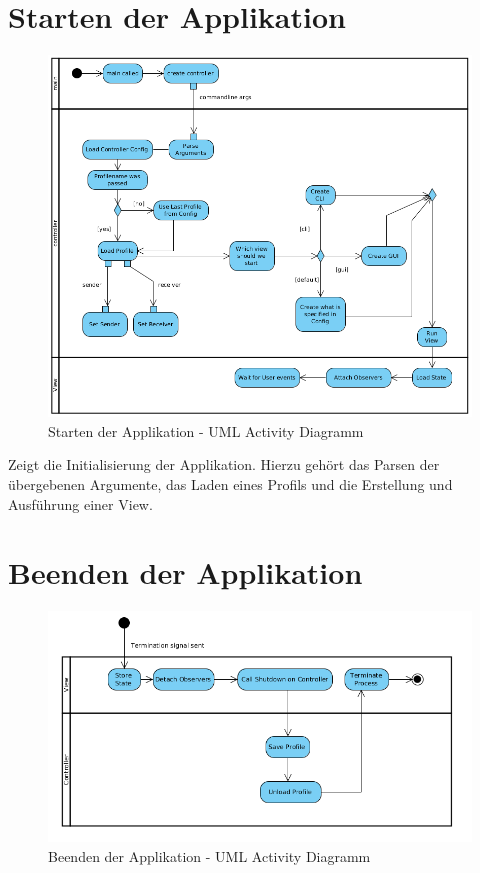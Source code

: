 
\section{Starten der Applikation}
\label{sec:5:startapp}
\begin{figure}[H]
\includegraphics[width=15cm]{images/Init.png}
\centering
\caption{Starten der Applikation - UML Activity Diagramm}
\label{fig_init}
\end{figure}

Zeigt die Initialisierung der Applikation. Hierzu gehört das Parsen der
übergebenen Argumente, das Laden eines Profils und die Erstellung und 
Ausführung einer View.

\section{Beenden der Applikation}
\label{sec:5:stopapp}
\begin{figure}[H]
\includegraphics[width=15cm]{images/Shutdown.png}
\centering
\caption{Beenden der Applikation - UML Activity Diagramm}
\label{fig_shutdown}
\end{figure}

